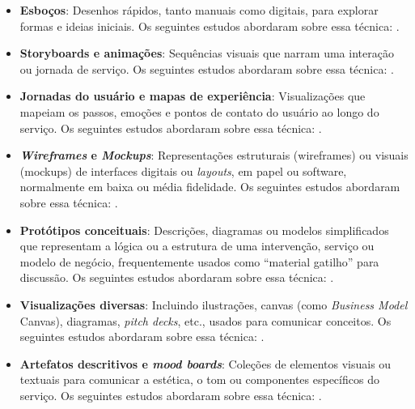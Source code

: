 \begin{itemize}
	\item \textbf{Esboços}: Desenhos rápidos, tanto manuais como digitais, para explorar formas e ideias iniciais. Os seguintes estudos abordaram sobre essa técnica: .
	
	\item \textbf{Storyboards e animações}: Sequências visuais que narram uma interação ou jornada de serviço. Os seguintes estudos abordaram sobre essa técnica: .
	
	\item \textbf{Jornadas do usuário e mapas de experiência}: Visualizações que mapeiam os passos, emoções e pontos de contato do usuário ao longo do serviço. Os seguintes estudos abordaram sobre essa técnica: .
	
	\item \textbf{\textit{Wireframes} e \textit{Mockups}}: Representações estruturais (wireframes) ou visuais (mockups) de interfaces digitais ou \textit{layouts}, em papel ou software, normalmente em baixa ou média fidelidade. Os seguintes estudos abordaram sobre essa técnica: .
	
	\item \textbf{Protótipos conceituais}: Descrições, diagramas ou modelos simplificados que representam a lógica ou a estrutura de uma intervenção, serviço ou modelo de negócio, frequentemente usados como ``material gatilho'' para discussão. Os seguintes estudos abordaram sobre essa técnica: .
	
	\item \textbf{Visualizações diversas}: Incluindo ilustrações, canvas (como \textit{Business Model} Canvas), diagramas, \textit{pitch decks}, etc., usados para comunicar conceitos. Os seguintes estudos abordaram sobre essa técnica: .
	
	\item \textbf{Artefatos descritivos e \textit{mood boards}}: Coleções de elementos visuais ou textuais para comunicar a estética, o tom ou componentes específicos do serviço. Os seguintes estudos abordaram sobre essa técnica: .
\end{itemize}

